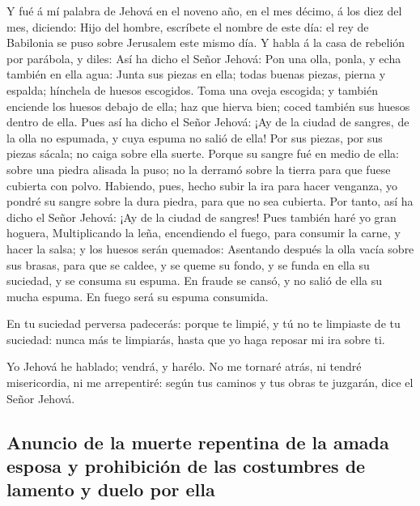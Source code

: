  Y fué á mí palabra de Jehová en el noveno año, en el mes
décimo, á los diez del mes, diciendo:  Hijo del hombre,
escríbete el nombre de este día: el rey de Babilonia se puso sobre
Jerusalem este mismo día.  Y habla á la casa de rebelión
por parábola, y diles: Así ha dicho el Señor Jehová: Pon una olla,
ponla, y echa también en ella agua:  Junta sus piezas en
ella; todas buenas piezas, pierna y espalda; hínchela de huesos
escogidos.  Toma una oveja escogida; y también enciende
los huesos debajo de ella; haz que hierva bien; coced también sus huesos
dentro de ella.  Pues así ha dicho el Señor Jehová: ¡Ay de
la ciudad de sangres, de la olla no espumada, y cuya espuma no salió de
ella! Por sus piezas, por sus piezas sácala; no caiga sobre ella suerte.
 Porque su sangre fué en medio de ella: sobre una piedra
alisada la puso; no la derramó sobre la tierra para que fuese cubierta
con polvo.  Habiendo, pues, hecho subir la ira para hacer
venganza, yo pondré su sangre sobre la dura piedra, para que no sea
cubierta.  Por tanto, así ha dicho el Señor Jehová: ¡Ay de
la ciudad de sangres! Pues también haré yo gran hoguera, 
Multiplicando la leña, encendiendo el fuego, para consumir la carne, y
hacer la salsa; y los huesos serán quemados:  Asentando
después la olla vacía sobre sus brasas, para que se caldee, y se queme
su fondo, y se funda en ella su suciedad, y se consuma su espuma.
 En fraude se cansó, y no salió de ella su mucha espuma.
En fuego será su espuma consumida.

 En tu suciedad perversa padecerás: porque te limpié, y
tú no te limpiaste de tu suciedad: nunca más te limpiarás, hasta que yo
haga reposar mi ira sobre ti.

 Yo Jehová he hablado; vendrá, y harélo. No me tornaré
atrás, ni tendré misericordia, ni me arrepentiré: según tus caminos y
tus obras te juzgarán, dice el Señor Jehová.

\hypertarget{anuncio-de-la-muerte-repentina-de-la-amada-esposa-y-prohibiciuxf3n-de-las-costumbres-de-lamento-y-duelo-por-ella}{%
\subsection{Anuncio de la muerte repentina de la amada esposa y
prohibición de las costumbres de lamento y duelo por
ella}\label{anuncio-de-la-muerte-repentina-de-la-amada-esposa-y-prohibiciuxf3n-de-las-costumbres-de-lamento-y-duelo-por-ella}}

